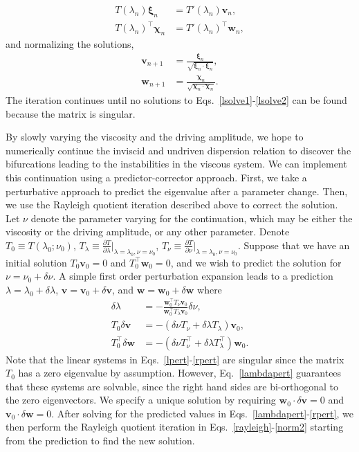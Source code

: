 \documentclass[aps,pre,amsmath,amssymb,floatfix,onecolumn,notitlepage,10pt]{revtex4-1}
\begin{document}
\begin{align}
T(\lambda_n) \bm{\xi}_n &= T'(\lambda_n)\mathbf{v}_n, \label{lsolve1} \\
T(\lambda_n)^\intercal \bm{\chi}_n &= T'(\lambda_n)^\intercal \mathbf{w}_n, \label{lsolve2}
\end{align}
and normalizing the solutions,
\begin{align}
\mathbf{v}_{n+1}&=\frac{\bm{\xi}_n}{\sqrt{\bm{\xi}_n \cdot \bm{\xi}_n} }, \\
\mathbf{w}_{n+1}&=\frac{\bm{\chi}_n}{\sqrt {\bm{\chi}_n \cdot \bm{\chi}_n}}. \label{norm2}
\end{align}
The iteration continues until no solutions to Eqs.~\eqref{lsolve1}-\eqref{lsolve2} can be found because the matrix is singular.

By slowly varying the viscosity and the driving amplitude, we hope to numerically continue the inviscid and undriven dispersion relation to discover the bifurcations leading to the instabilities in the viscous system.  We can implement this continuation using a predictor-corrector approach. First, we take a perturbative approach to predict the eigenvalue after a parameter change. Then, we use the Rayleigh quotient iteration described above to correct the solution. Let $\nu$ denote the parameter varying for the continuation, which may be either the viscosity or the driving amplitude, or any other parameter. Denote $T_0 \equiv T(\lambda_0;\nu_0)$, $T_\lambda \equiv \frac{\partial T}{\partial \lambda}\rvert_{\lambda=\lambda_0, \nu=\nu_0}$, $T_\nu \equiv \frac{\partial T}{\partial \nu}\rvert_{\lambda=\lambda_0, \nu=\nu_0}$.  Suppose that we have  an initial solution $T_0\mathbf{v}_0=0$ and $T_0^\intercal \mathbf{w}_0=0$, and we wish to predict the solution for $\nu=\nu_0 + \delta\nu$.  A simple first order perturbation expansion leads to a prediction $\lambda = \lambda_0 +\delta\lambda$, $\mathbf{v}=\mathbf{v}_0+\delta\mathbf{v}$, and $\mathbf{w}=\mathbf{w}_0+\delta\mathbf{w}$ where
\begin{align}
\delta\lambda &= - \frac{\mathbf{w}_0^\intercal T_\nu \mathbf{v}_0} { \mathbf{w}_0^\intercal T_\lambda \mathbf{v}_0}\delta\nu, \label{lambdapert} \\
T_0 \delta \mathbf{v} &= -(\delta \nu T_\nu + \delta\lambda T_\lambda) \mathbf{v}_0, \label{lpert} \\
T_0^\intercal \delta \mathbf{w} &= -(\delta \nu T_\nu^\intercal + \delta\lambda T_\lambda^\intercal) \mathbf{w}_0. \label{rpert}
\end{align}
Note that the linear systems in Eqs.~\eqref{lpert}-\eqref{rpert} are singular since the matrix $T_0$ has a zero eigenvalue by assumption. However, Eq.~\eqref{lambdapert} guarantees that these systems are solvable, since the right hand sides are bi-orthogonal to the zero eigenvectors. We specify a unique solution by requiring $\mathbf{w}_0\cdot \delta\mathbf{v}=0$ and $\mathbf{v}_0\cdot \delta\mathbf{w}=0$. After solving for the predicted values in Eqs.~\eqref{lambdapert}-\eqref{rpert}, we then perform the Rayleigh quotient iteration in Eqs.~\eqref{rayleigh}-\eqref{norm2} starting from the prediction to find the new solution. 
\end{document}

